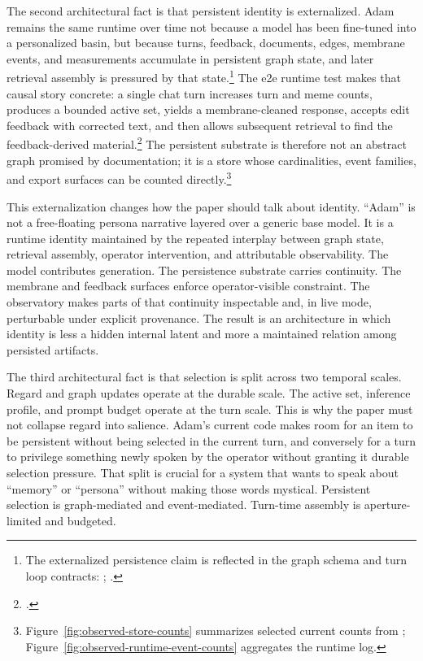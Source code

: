 \documentclass[10pt]{article}
\begin{document}
The second architectural fact is that persistent identity is externalized. Adam remains the same runtime over time not because a model has been fine-tuned into a personalized basin, but because turns, feedback, documents, edges, membrane events, and measurements accumulate in persistent graph state, and later retrieval assembly is pressured by that state.\footnote{The externalized persistence claim is reflected in the graph schema and turn loop contracts: ; .} The e2e runtime test makes that causal story concrete: a single chat turn increases turn and meme counts, produces a bounded active set, yields a membrane-cleaned response, accepts edit feedback with corrected text, and then allows subsequent retrieval to find the feedback-derived material.\footnote{.} The persistent substrate is therefore not an abstract graph promised by documentation; it is a store whose cardinalities, event families, and export surfaces can be counted directly.\footnote{Figure~\ref{fig:observed-store-counts} summarizes selected current counts from ; Figure~\ref{fig:observed-runtime-event-counts} aggregates the runtime log.}

This externalization changes how the paper should talk about identity. ``Adam'' is not a free-floating persona narrative layered over a generic base model. It is a runtime identity maintained by the repeated interplay between graph state, retrieval assembly, operator intervention, and attributable observability. The model contributes generation. The persistence substrate carries continuity. The membrane and feedback surfaces enforce operator-visible constraint. The observatory makes parts of that continuity inspectable and, in live mode, perturbable under explicit provenance. The result is an architecture in which identity is less a hidden internal latent and more a maintained relation among persisted artifacts.

The third architectural fact is that selection is split across two temporal scales. Regard and graph updates operate at the durable scale. The active set, inference profile, and prompt budget operate at the turn scale. This is why the paper must not collapse regard into salience. Adam's current code makes room for an item to be persistent without being selected in the current turn, and conversely for a turn to privilege something newly spoken by the operator without granting it durable selection pressure. That split is crucial for a system that wants to speak about ``memory'' or ``persona'' without making those words mystical. Persistent selection is graph-mediated and event-mediated. Turn-time assembly is aperture-limited and budgeted.
\end{document}
